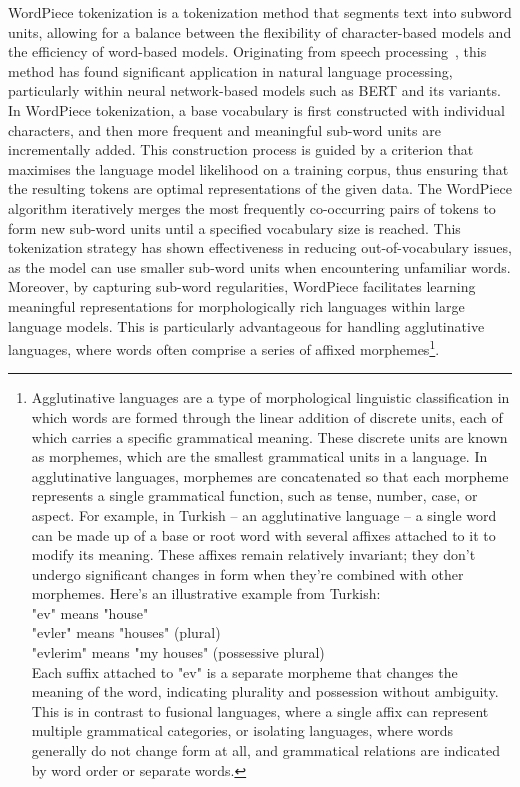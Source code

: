 WordPiece tokenization is a tokenization method that segments text into subword units, allowing for a balance between the flexibility of character-based models and the efficiency of word-based models.
Originating from speech processing~\cite{wu2016google}, this method has found significant application in natural language processing, particularly within neural network-based models such as BERT and its variants.
In WordPiece tokenization, a base vocabulary is first constructed with individual characters, and then more frequent and meaningful sub-word units are incrementally added.
This construction process is guided by a criterion that maximises the language model likelihood on a training corpus, thus ensuring that the resulting tokens are optimal representations of the given data.
The WordPiece algorithm iteratively merges the most frequently co-occurring pairs of tokens to form new sub-word units until a specified vocabulary size is reached.
This tokenization strategy has shown effectiveness in reducing out-of-vocabulary issues, as the model can use smaller sub-word units when encountering unfamiliar words.
Moreover, by capturing sub-word regularities, WordPiece facilitates learning meaningful representations for morphologically rich languages within large language models.
This is particularly advantageous for handling agglutinative languages, where words often comprise a series of affixed morphemes\footnote{
	Agglutinative languages are a type of morphological linguistic classification in which words are formed through the linear addition of discrete units, each of which carries a specific grammatical meaning. These discrete units are known as morphemes, which are the smallest grammatical units in a language. In agglutinative languages, morphemes are concatenated so that each morpheme represents a single grammatical function, such as tense, number, case, or aspect.
	For example, in Turkish -- an agglutinative language -- a single word can be made up of a base or root word with several affixes attached to it to modify its meaning. These affixes remain relatively invariant; they don’t undergo significant changes in form when they’re combined with other morphemes. Here’s an illustrative example from Turkish:\\
	"ev" means "house"\\
	"evler" means "houses" (plural)\\
	"evlerim" means "my houses" (possessive plural)\\
	Each suffix attached to "ev" is a separate morpheme that changes the meaning of the word, indicating plurality and possession without ambiguity.
	This is in contrast to fusional languages, where a single affix can represent multiple grammatical categories, or isolating languages, where words generally do not change form at all, and grammatical relations are indicated by word order or separate words.
}.

